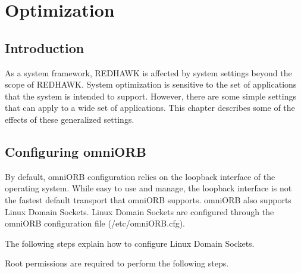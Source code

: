 \chapter{Optimization}

\label{chap:Optimization}

\section{Introduction}

As a system framework, REDHAWK is affected by system settings beyond the scope of REDHAWK. System optimization is sensitive to the set of applications that the system is intended to support. However, there are some simple settings that can apply to a wide set of applications. This chapter describes some of the effects of these generalized settings.

\section{Configuring omniORB}
\label{section:omniORBConfigurationPipes}

By default, omniORB configuration relies on the loopback interface of the operating system. While easy to use and manage, the loopback interface is not the fastest default transport that omniORB supports. omniORB also supports Linux Domain Sockets. Linux Domain Sockets are configured through the omniORB configuration file (/etc/omniORB.cfg).

The following steps explain how to configure Linux Domain Sockets.

\begin{note}
Root permissions are required to perform the following steps.
\end{note}

